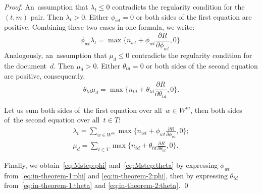 \documentclass{acm_proc_article-sp}
\begin{document}
\begin{proof}
    An~assumption that $\lambda_t\leq 0$ contradicts the regularity condition for the $(t,m)$ pair.
    Then ${\lambda_t>0}$.
    Either ${\phi_{wt}= 0}$ or both sides of the first equation are positive.
    Combining these two cases in one formula, we write:
    \begin{equation}
    \label{eq:in-theorem-1:phi}
        \phi_{wt} \lambda_t
        =
        \max\biggl\{
        n_{wt} + \phi_{wt} \frac{\partial R}{\partial \phi_{wt}}, 0
        \biggr\}.
    \end{equation}
    Analogously,
    an~assumption that $\mu_d\leq 0$ contradicts the regularity condition for the document~$d$.
    Then ${\mu_d>0}$.
    Either ${\theta_{td}= 0}$ or both sides of the second equation are positive,
    consequently,
    \begin{equation}
    \label{eq:in-theorem-1:theta}
        \theta_{td} \mu_d
        =
        \max\biggl\{
        n_{td} + \theta_{td} \frac{\partial R}{\partial \theta_{td}}, 0
        \biggr\}.
    \end{equation}

    Let us sum
    both sides of~the first equation over all~${w\in W^m}$,
    then
    both sides of~the second equation over all~${t\in T}$:
    \begin{gather}
    \label{eq:in-theorem-2:phi}
        \lambda_t
        =
        \sum_{w\in W^m}
        \max\biggl\{
        n_{wt} + \phi_{wt} \frac{\partial R}{\partial \phi_{wt}}, 0
        \biggr\};
    \\
    \label{eq:in-theorem-2:theta}
        \mu_d
        =
        \sum_{t\in T}
        \max\biggl\{
        n_{td} + \theta_{td} \frac{\partial R}{\partial \theta_{td}}, 0
        \biggr\}.
    \end{gather}

    Finally,
    we obtain~\eqref{eq:Mstep:phi} and~\eqref{eq:Mstep:theta}
    by expressing $\phi_{wt}$ from~\eqref{eq:in-theorem-1:phi} and \eqref{eq:in-theorem-2:phi},
    then 
    by expressing $\theta_{td}$ from~\eqref{eq:in-theorem-1:theta} and \eqref{eq:in-theorem-2:theta}.
    \qed
\end{proof}
\end{document}
